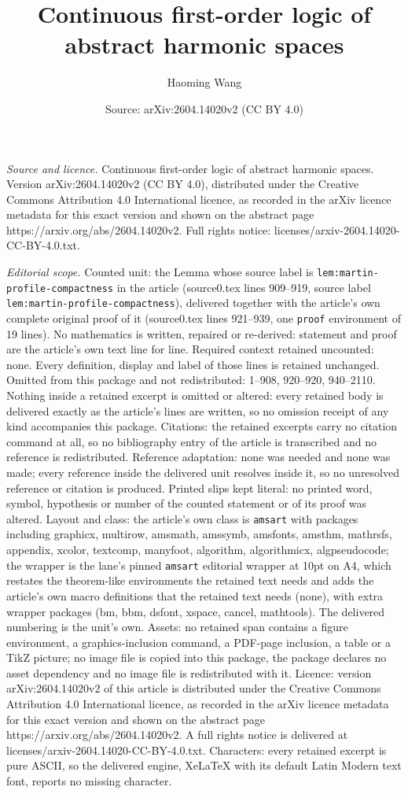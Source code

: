 \documentclass[10pt,a4paper]{amsart}
\title[Continuous first-order logic of abstract harmonic spaces]{Continuous first-order logic of abstract harmonic spaces}
\author{Haoming Wang}
\date{Source: arXiv:2604.14020v2 (CC BY 4.0)}
\begin{document}
\maketitle

\noindent\emph{Source and licence.} Continuous first-order logic of abstract harmonic spaces. Version arXiv:2604.14020v2 (CC BY 4.0), distributed under the Creative Commons Attribution 4.0 International licence, as recorded in the arXiv licence metadata for this exact version and shown on the abstract page https://arxiv.org/abs/2604.14020v2. Full rights notice: licenses/arxiv-2604.14020-CC-BY-4.0.txt.\par\smallskip

\noindent\textit{Editorial scope.} Counted unit: the Lemma whose source label is \texttt{lem:martin-profile-compactness} in the article (source0.tex lines 909--919, source label \texttt{lem:martin-profile-compactness}), delivered together with the article's own complete original proof of it (source0.tex lines 921--939, one \texttt{proof} environment of 19 lines). No mathematics is written, repaired or re-derived: statement and proof are the article's own text line for line. Required context retained uncounted: none. Every definition, display and label of those lines is retained unchanged. Omitted from this package and not redistributed: 1--908, 920--920, 940--2110. Nothing inside a retained excerpt is omitted or altered: every retained body is delivered exactly as the article's lines are written, so no omission receipt of any kind accompanies this package. Citations: the retained excerpts carry no citation command at all, so no bibliography entry of the article is transcribed and no reference is redistributed. Reference adaptation: none was needed and none was made; every reference inside the delivered unit resolves inside it, so no unresolved reference or citation is produced. Printed slips kept literal: no printed word, symbol, hypothesis or number of the counted statement or of its proof was altered. Layout and class: the article's own class is \texttt{amsart} with packages including graphicx, multirow, amsmath, amssymb, amsfonts, amsthm, mathrsfs, appendix, xcolor, textcomp, manyfoot, algorithm, algorithmicx, algpseudocode; the wrapper is the lane's pinned \texttt{amsart} editorial wrapper at 10pt on A4, which restates the theorem-like environments the retained text needs and adds the article's own macro definitions that the retained text needs (none), with extra wrapper packages (bm, bbm, dsfont, xspace, cancel, mathtools). The delivered numbering is the unit's own. Assets: no retained span contains a figure environment, a graphics-inclusion command, a PDF-page inclusion, a table or a TikZ picture; no image file is copied into this package, the package declares no asset dependency and no image file is redistributed with it. Licence: version arXiv:2604.14020v2 of this article is distributed under the Creative Commons Attribution 4.0 International licence, as recorded in the arXiv licence metadata for this exact version and shown on the abstract page https://arxiv.org/abs/2604.14020v2. A full rights notice is delivered at licenses/arxiv-2604.14020-CC-BY-4.0.txt. Characters: every retained excerpt is pure ASCII, so the delivered engine, XeLaTeX with its default Latin Modern text font, reports no missing character.
\end{document}
